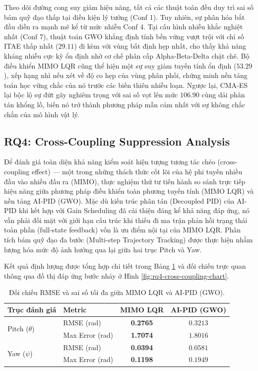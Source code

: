 \documentclass[conference, a4paper]{IEEEtran}
\begin{document}
Theo dõi đường cong suy giảm hiệu năng, tất cả các thuật toán đều duy trì sai số bám quỹ đạo thấp tại điều kiện lý tưởng (Conf 1). Tuy nhiên, sự phân hóa bắt đầu diễn ra mạnh mẽ kể từ mức nhiễu Conf 4. Tại cấu hình nhiễu khắc nghiệt nhất (Conf 7), thuật toán GWO khẳng định tính bền vững vượt trội với chỉ số ITAE thấp nhất ($29.11$) đi kèm với vùng bất định hẹp nhất, cho thấy khả năng kháng nhiễu cực kỳ ổn định nhờ cơ chế phân cấp Alpha-Beta-Delta chặt chẽ. Bộ điều khiển MIMO LQR cũng thể hiện một sự suy giảm tuyến tính ổn định ($53.29$), xếp hạng nhì nếu xét về độ co hẹp của vùng phân phối, chứng minh nền tảng toán học vững chắc của nó trước các biến thiên nhiễu loạn. Ngược lại, CMA-ES lại bộc lộ sự đứt gãy nghiêm trọng với sai số vọt lên mức $106.90$ cùng dải phân tán khổng lồ, biến nó trở thành phương pháp mẫn cảm nhất với sự không chắc chắn của mô hình vật lý.

\subsection{RQ4: Cross-Coupling Suppression Analysis}
Để đánh giá toàn diện khả năng kiểm soát hiện tượng tương tác chéo (cross-coupling effect) — một trong những thách thức cốt lõi của hệ phi tuyến nhiều đầu vào nhiều đầu ra (MIMO), thực nghiệm thứ tư tiến hành so sánh trực tiếp hiệu năng giữa phương pháp điều khiển toàn phương tuyến tính (MIMO LQR) và nền tảng AI-PID (GWO). Mặc dù kiến trúc phân tán (Decoupled PID) của AI-PID khi kết hợp với Gain Scheduling đã cải thiện đáng kể khả năng đáp ứng, nó vẫn phải đối mặt với giới hạn cấu trúc khi thiếu đi ma trận phản hồi trạng thái toàn phần (full-state feedback) vốn là ưu điểm nội tại của MIMO LQR. Phân tích bám quỹ đạo đa bước (Multi-step Trajectory Tracking) được thực hiện nhằm lượng hóa mức độ ảnh hưởng qua lại giữa hai trục Pitch và Yaw.

Kết quả định lượng được tổng hợp chi tiết trong Bảng \ref{tab:rq4-cross-coupling-metrics} và đối chiếu trực quan thông qua đồ thị đáp ứng bước nhảy ở Hình \ref{fig:rq4-cross-coupling-chart}.

\begin{table}[!t]
\caption{Đối chiếu RMSE và sai số tối đa giữa MIMO LQR và AI-PID (GWO).}
\label{tab:rq4-cross-coupling-metrics}
\centering
\small
\begin{tabular}{llcc}
\toprule
Trục đánh giá & Metric & MIMO LQR & AI-PID (GWO) \\
\midrule
\multirow{2}{*}{Pitch ($\theta$)} & RMSE (rad) & \textbf{0.2765} & $0.3213$ \\
 & Max Error (rad) & \textbf{1.7074} & $1.8016$ \\
\midrule
\multirow{2}{*}{Yaw ($\psi$)} & RMSE (rad) & \textbf{0.0394} & $0.0581$ \\
 & Max Error (rad) & \textbf{0.1198} & $0.1949$ \\
\bottomrule
\end{tabular}
\end{table}
\end{document}

